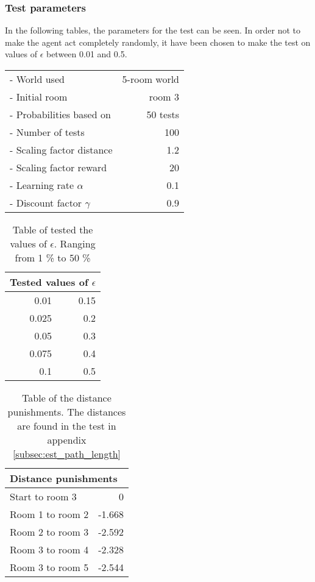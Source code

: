 \documentclass[../Head/Main.tex]{subfiles}
\begin{document}
\subsubsection{Test parameters}
In the following tables, the parameters for the test can be seen. In order not to make the agent act completely randomly, it have been chosen to make the test on values of $\epsilon$ between 0.01 and 0.5.\\
\begin{minipage}[c]{0.35\textwidth}
	\begin{tabular}{l r}
	- World used                & 5-room world\\
	- Initial room              & room 3\\	
	- Probabilities based on    & 50 tests\\	
	- Number of tests           & 100\\
	- Scaling factor distance   & 1.2\\
	- Scaling factor reward     & 20\\
	- Learning rate $\alpha$    & 0.1\\
	- Discount factor $\gamma$  & 0.9\\
	\end{tabular}
\end{minipage}	
\hfill
\begin{minipage}[c]{0.2\textwidth}
	\begin{table}[H]
		\centering
		\begin{tabular}{r r}
		\hline
		\multicolumn{2}{l}{\textbf{Tested values of $\epsilon$}}\\ 			\hline
		0.01   & 0.15\\
		0.025  & 0.2\\
		0.05   & 0.3\\
		0.075  & 0.4\\
		0.1    & 0.5\\
		\hline
		\end{tabular}
		\caption{Table of tested the values of $\epsilon$. Ranging from 1 \% to 50 \%}
		\label{tab:test_epsilon}
	\end{table}
\end{minipage}
\hfill
\begin{minipage}[c]{0.3\textwidth}
	\begin{table}[H]
	\centering
	\begin{tabular}{l r}
		\hline
		\multicolumn{2}{l}{\textbf{Distance punishments}}\\ 			\hline
		Start to room 3   & 0\\
		Room 1 to room 2  & -1.668\\
		Room 2 to room 3  & -2.592\\
		Room 3 to room 4  & -2.328\\
		Room 3 to room 5  & -2.544\\
		\hline
	\end{tabular}
	\caption{Table of the distance punishments. The distances are found in the test in appendix \ref{subsec:est_path_length}}
	\label{tab:distance_punishment_5_rooms}
\end{table}
\end{minipage}
\end{document}
